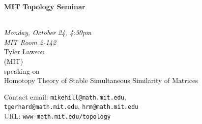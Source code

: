 \documentclass{slides}
\begin{document}
\begin{center}

{\fontsize {54pt}{40pt}\selectfont

\textrm{
{\textbf{MIT Topology Seminar}}}
}\\
\vspace{1cm}
{\large\textrm{\emph{Monday, October 24, 4:30pm\\MIT Room 2-142}}}\\
\vspace{1cm}
\textrm{{\LARGE Tyler Lawson  \\[.5cm](MIT)}}\\
\vspace{1cm} %
\textrm{speaking on}\\ %
\vspace{5mm}
\textrm{{\LARGE Homotopy Theory of Stable Simultaneous Similarity of Matrices}}\\
\end{center}
\vspace{1cm}


\textrm{Contact email: } \texttt{mikehill@math.mit.edu}, \\
\texttt{tgerhard@math.mit.edu},
\texttt{hrm@math.mit.edu}\\
\textrm{URL: } \texttt{www-math.mit.edu/topology}
\end{document}
